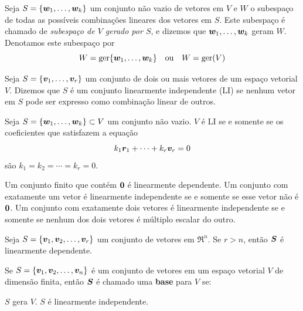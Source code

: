 \begin{definition}
	Seja $S = \{ \bm{w}_1, \ldots, \bm{w}_k \}$ um conjunto não vazio de vetores em $V$ e $W$ o subespaço de todas as possíveis combinações lineares dos vetores em $S$. Este subespaço é chamado de \textit{subespaço de $V$  gerado por $S$}, e dizemos que $\bm{w}_1, \ldots, \bm{w}_k$ geram $W$. Denotamos este subespaço por
	\begin{equation}
		W = \operatorname{ger} \{ \bm{w}_1, \ldots, \bm{w}_k \} \quad \text{ou} \quad  W = \operatorname{ger}(V)
	\end{equation}
\end{definition}

\begin{definition}[Conjunto LI]
	Seja $S = \{ \bm{v}_1, \ldots, \bm{v}_r \}$ um conjunto de dois ou mais vetores de um espaço vetorial $V$. Dizemos que $S$ é um conjunto linearmente independente (LI) se nenhum vetor em $S$ pode ser expresso como combinação linear de outros.
\end{definition}

\begin{theorem}
	Seja $S = \{ \bm{w}_1, \ldots, \bm{w}_k \} \subset V$ um conjunto não vazio. $V$ é LI se e somente se os coeficientes que satisfazem a equação 
	\begin{equation}
		k_1 \bm{r}_1 + \cdots + k_r \bm{v}_r = 0
	\end{equation}
	são $k_1=k_2=\cdots=k_r = 0$.
\end{theorem}

\begin{theorem}[4.3.2, Anton]
	\leavevmode
	\begin{outline}[enumerate]
		\1 Um conjunto finito que contém $\bm{0}$ é linearmente dependente.
		\1 Um conjunto com exatamente um vetor é linearmente independente se e somente se esse vetor não é $\bm{0}$.
		\1 Um conjunto com exatamente dois vetores é linearmente independente se e somente se nenhum dos dois vetores é múltiplo escalar do outro.
	\end{outline}
\end{theorem}

\begin{theorem}[4.3.3, Anton]
	Seja $S = \{\bm{v}_1,\bm{v}_2,\ldots,\bm{v}_r\}$ um conjunto de vetores em $\Re^n$. Se $r>n$, então $\bm{S}$ é linearmente dependente.
\end{theorem}

\begin{definition}
	Se $S = \{\bm{v}_1,\bm{v}_2,\ldots,\bm{v}_n\}$ é um conjunto de vetores em um espaço vetorial $V$ de dimensão finita, então $\bm{S}$ é chamado uma \textbf{base} para $V$ se:
	\begin{outline}[enumerate]
		\1 $S$ gera $V$.
		\1 $S$ é linearmente independente.
	\end{outline}
\end{definition}


